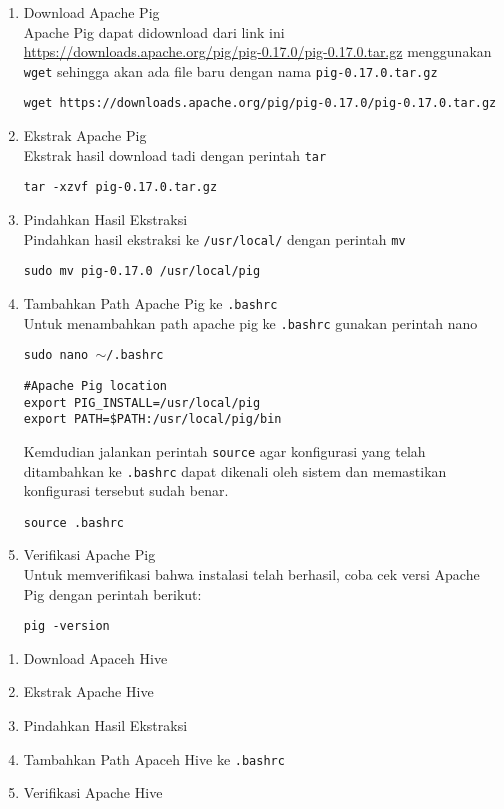 \documentclass[a4paper]{tufte-handout}
\begin{document}
\begin{enumerate}
\item Download Apache Pig  \\
Apache Pig dapat didownload dari link ini \url{https://downloads.apache.org/pig/pig-0.17.0/pig-0.17.0.tar.gz} menggunakan {\tt wget} sehingga akan ada file baru dengan nama {\tt pig-0.17.0.tar.gz}

{\tt wget https://downloads.apache.org/pig/pig-0.17.0/pig-0.17.0.tar.gz}

\item Ekstrak Apache Pig \\
Ekstrak hasil download tadi dengan perintah {\tt tar}

{\tt tar -xzvf pig-0.17.0.tar.gz}

\item Pindahkan Hasil Ekstraksi \\
Pindahkan hasil ekstraksi ke {\tt /usr/local/} dengan perintah {\tt mv}

{\tt sudo mv pig-0.17.0 /usr/local/pig}

\item Tambahkan Path Apache Pig ke {\tt .bashrc} \\
Untuk menambahkan path apache pig ke {\tt .bashrc} gunakan perintah nano

{\tt sudo nano $\sim$/.bashrc}

\begin{lstlisting}
#Apache Pig location
export PIG_INSTALL=/usr/local/pig
export PATH=$PATH:/usr/local/pig/bin
\end{lstlisting}

Kemdudian jalankan perintah {\tt source} agar konfigurasi yang telah ditambahkan ke {\tt .bashrc} dapat dikenali oleh sistem dan memastikan konfigurasi tersebut sudah benar.

{\tt source .bashrc}

\item Verifikasi Apache Pig \\
Untuk memverifikasi bahwa instalasi telah berhasil, coba cek versi Apache Pig dengan perintah berikut:

{\tt pig -version}
\end{enumerate}

\clearpage
{}


\begin{enumerate}
\item Download Apaceh Hive
\item Ekstrak Apache Hive
\item Pindahkan Hasil Ekstraksi
\item Tambahkan Path Apaceh Hive ke {\tt .bashrc}
\item Verifikasi Apache Hive
\end{enumerate}
\end{document}
